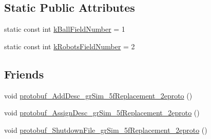 \subsection*{Static Public Attributes}
\begin{DoxyCompactItemize}
\item 
static const int \hyperlink{classgr_sim___replacement_ae0896bb58d6c239c4ab7a1a50a635026}{k\-Ball\-Field\-Number} = 1
\item 
static const int \hyperlink{classgr_sim___replacement_af8a95c3e68d4db5284c93d55a67f0323}{k\-Robots\-Field\-Number} = 2
\end{DoxyCompactItemize}
\subsection*{Friends}
\begin{DoxyCompactItemize}
\item 
void \hyperlink{classgr_sim___replacement_a9ac32e27f85f830ef01942ad673705b7}{protobuf\-\_\-\-Add\-Desc\-\_\-gr\-Sim\-\_\-5f\-Replacement\-\_\-2eproto} ()
\item 
void \hyperlink{classgr_sim___replacement_a973404afe16402ca581cbe74d3e0a674}{protobuf\-\_\-\-Assign\-Desc\-\_\-gr\-Sim\-\_\-5f\-Replacement\-\_\-2eproto} ()
\item 
void \hyperlink{classgr_sim___replacement_a495a36d90087973987ea2ddca30870c8}{protobuf\-\_\-\-Shutdown\-File\-\_\-gr\-Sim\-\_\-5f\-Replacement\-\_\-2eproto} ()
\end{DoxyCompactItemize}


